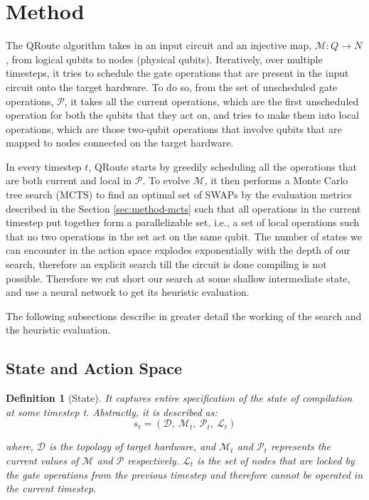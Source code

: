 \newtheorem{defn}{Definition}[section]

\section{\label{sec:method}Method}

The QRoute algorithm takes in an input circuit and an injective map, $\mathcal{M}: Q \rightarrow N$, from logical qubits to nodes (physical qubits). Iteratively, over multiple timesteps, it tries to schedule the gate operations that are present in the input circuit onto the target hardware. To do so, from the set of unscheduled gate operations, $\mathcal{P}$, it takes all the current operations, which are the first unscheduled operation for both the qubits that they act on, and tries to make them into local operations, which are those two-qubit operations that involve qubits that are mapped to nodes connected on the target hardware.

In every timestep $t$, QRoute starts by greedily scheduling all the operations that are both current and local in $\mathcal{P}$. To evolve $\mathcal{M}$, it then performs a Monte Carlo tree search (MCTS) to find an optimal set of SWAPs by the evaluation metrics described in the Section \ref{sec:method-mcts} such that all operations in the current timestep put together form a parallelizable set, i.e., a set of local operations such that no two operations in the set act on the same qubit. The number of states we can encounter in the action space explodes exponentially with the depth of our search, therefore an explicit search till the circuit is done compiling is not possible. Therefore we cut short our search at some shallow intermediate state, and use a neural network to get its heuristic evaluation.


The following subsections describe in greater detail the working of the search and the heuristic evaluation.

\subsection{\label{sec:method-state} State and Action Space}

\begin{defn}[State]
    It captures entire specification of the state of compilation at some timestep t. Abstractly, it is described as:
    \begin{equation}
        s_{t} = (\mathcal{D}, \ \mathcal{M}_{t},\ \mathcal{P}_{t},\ \mathcal{L}_{t})
    \end{equation}

    where, $\mathcal{D}$ is the topology of target hardware, and $\mathcal{M}_t$ and $\mathcal{P}_t$ represents the current values of $\mathcal{M}$ and $\mathcal{P}$ respectively. $\mathcal{L}_{t}$ is the set of nodes that are locked by the gate operations from the previous timestep and therefore cannot be operated in the current timestep. 
\end{defn}


